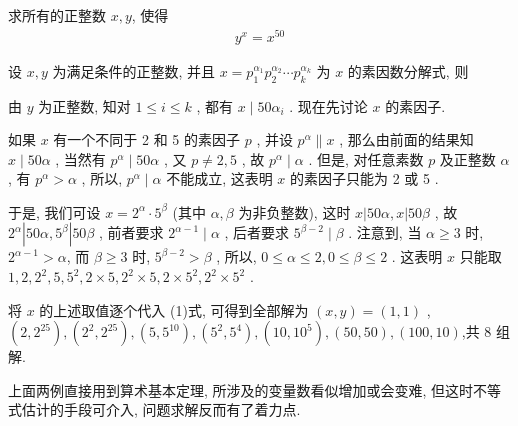 \begin{example}
	求所有的正整数 $x, y$, 使得
	\begin{align*}
		y^{x}=x^{50}
	\end{align*}
\end{example}
\begin{solution}
	设 $x ,  y$ 为满足条件的正整数, 并且 $x=p_{1}^{\alpha_{1}} p_{2}^{\alpha_{2}} \cdots p_{k}^{\alpha_{k}}$ 为 $x$ 的素因数分解式, 则

	由 $y$ 为正整数, 知对 $1 \leqslant i \leqslant k$ , 都有 $x \mid 50 \alpha_{i}$ . 现在先讨论 $x$ 的素因子.

	如果 $x$ 有一个不同于 2 和 5 的素因子 $p$ , 并设 $p^{\alpha} \| x$ , 那么由前面的结果知 $x \mid 50 \alpha$ , 当然有 $p^{\alpha} \mid 50 \alpha$ , 又 $p \neq 2 ,  5$ , 故 $p^{\alpha} \mid \alpha$ . 但是, 对任意素数 $p$ 及正整数 $\alpha$ , 有 $p^{\alpha}>\alpha$ , 所以,  $p^{\alpha} \mid \alpha$ 不能成立, 这表明 $x$ 的素因子只能为 2 或 5 .

	于是, 我们可设 $x=2^{\alpha} \cdot 5^{\beta}$ (其中 $\alpha ,  \beta$ 为非负整数), 这时 $x|50 \alpha, x| 50 \beta$ , 故 $2^{\alpha}\left|50 \alpha, 5^{\beta}\right| 50 \beta$ , 前者要求 $2^{\alpha-1} \mid \alpha$ , 后者要求 $5^{\beta-2} \mid \beta$ . 注意到, 当 $\alpha \geqslant 3$ 时,  $2^{\alpha-1}>\alpha$, 而 $\beta \geqslant 3$ 时, $5^{\beta-2}>\beta$ , 所以,  $0 \leqslant \alpha \leqslant 2,0 \leqslant \beta \leqslant 2$ . 这表明 $x$ 只能取 $1,2,2^{2}, 5,5^{2}, 2 \times 5,2^{2} \times 5,2 \times 5^{2}, 2^{2} \times 5^{2}$ .

	将 $x$ 的上述取值逐个代入 (1)式, 可得到全部解为 $(x, y)=(1,1)$ ,  $\left(2,2^{25}\right),\left(2^{2}, 2^{25}\right),\left(5,5^{10}\right),\left(5^{2}, 5^{4}\right),\left(10,10^{5}\right),(50,50),(100,10)$,共 8 组解.
\end{solution}
\begin{note}
	上面两例直接用到算术基本定理, 所涉及的变量数看似增加或会变难, 但这时不等式估计的手段可介入, 问题求解反而有了着力点.
\end{note}

